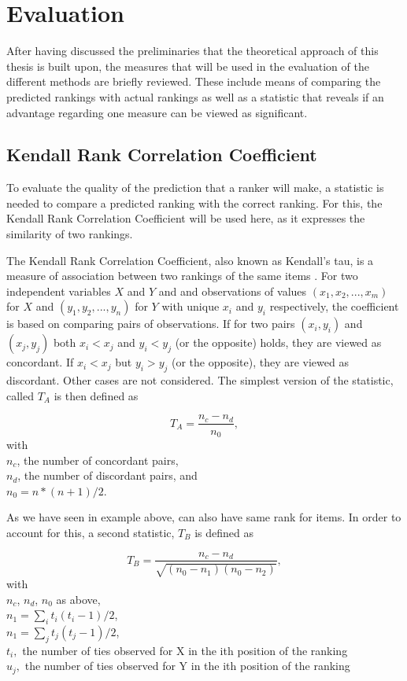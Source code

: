 
\section{Evaluation}

After having discussed the preliminaries that the theoretical approach of this thesis is built upon, the measures that will be used in the evaluation of the different methods are briefly reviewed. These include means of comparing the predicted rankings with actual rankings as well as a statistic that reveals if an advantage regarding one measure can be viewed as significant.

\subsection{Kendall Rank Correlation Coefficient}
To evaluate the quality of the prediction that a ranker will make, a statistic is needed to compare a predicted ranking with the correct ranking. For this, the Kendall Rank Correlation Coefficient will be used here, as it expresses the similarity of two rankings.

The Kendall Rank Correlation Coefficient, also known as Kendall's tau, is a measure of association between two rankings of the same items \cite{kendall1938new}. For two independent variables $X$ and $Y$ and and observations of values $(x_1,x_2,...,x_m)$ for $X$ and $(y_1,y_2,...,y_n)$ for $Y$ with unique $x_i$ and $y_i$ respectively, the coefficient is based on comparing pairs of observations. If for two pairs $(x_i,y_i)$ and $(x_j,y_j)$ both $x_i < x_j$ and $y_i < y_j$ (or the opposite) holds, they are viewed as concordant. If $x_i < x_j$ but $y_i > y_j$ (or the opposite), they are viewed as discordant. Other cases are not considered. The simplest version of the statistic, called $T_A$ is then defined as 

$$T_A = \frac{n_c - n_d}{n_0},$$
with \\
$n_c$, the number of concordant pairs, \\
$n_d$, the number of discordant pairs, and \\
$n_0 = n * (n + 1) / 2$.

As we have seen in example above, can also have same rank for items. In order to account for this, a second statistic, $T_B$ is defined as

$$T_B = \frac{n_c - n_d}{\sqrt{(n_0 - n_1 )(n_0 - n_2 )}},$$
with \\
$n_c$, $n_d$, $n_0$ as above, \\
$n_1=\sum_i{t_i(t_i-1)/2}$, \\
$n_1=\sum_j{t_j(t_j-1)/2}$, \\
$t_i,$ the number of ties observed for X in the ith position of the ranking \\
$u_j,$ the number of ties observed for Y in the ith position of the ranking 

